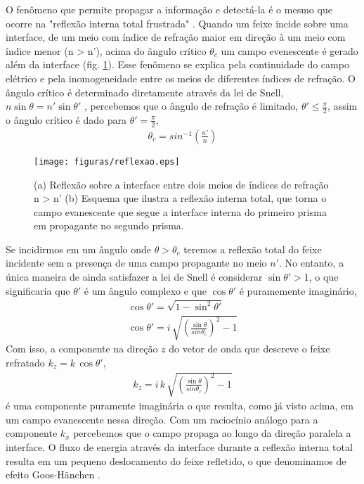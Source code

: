 O fenômeno que permite propagar a informação e detectá-la é o mesmo que ocorre na "reflexão interna total frustrada"  \cite{principle}. Quando um feixe incide sobre uma interface, de um meio com índice de refração maior em direção à um meio com índice menor (n > n'), acima do ângulo crítico $\theta_c$ um campo evenescente é gerado além da interface (fig. \ref{fig:reflexao}). Esse fenômeno se explica pela continuidade do campo elétrico e pela inomogeneidade entre os meios de diferentes índices de refração. O ângulo crítico é determinado diretamente através da lei de Snell, $n\sin{\theta}=n'\sin{\theta '}$  \cite{jackson}, percebemos que o ângulo de refração é limitado, $\theta ' \leq \frac{\pi}{2}$, assim o ângulo crítico é dado para $\theta ' = \frac{\pi}{2}$,
\begin{eqnarray}
\theta_c=sin^{-1}\left({\frac{n'}{n}}\right)
\label{angcritico}
\end{eqnarray}
\begin{figure}[h]
\centering
\texttt{[image: figuras/reflexao.eps]}
\caption{(a) Reflexão sobre a interface entre dois meios de índices de refração n > n' (b) Esquema que ilustra a reflexão interna total, que torna o campo evanescente que segue a interface interna do primeiro prisma em propagante no segundo prisma.  \cite{principle}}
\label{fig:reflexao}
\end{figure}
Se incidirmos em um ângulo onde $\theta > \theta_c$ teremos a reflexão total do feixe incidente sem a presença de uma campo propagante no meio $n'$. No entanto, a única maneira de ainda satisfazer a lei de Snell é considerar $\sin{\theta '} > 1$, o que significaria que $\theta '$ é um ângulo complexo e que $\cos{\theta '}$ é puramemente imaginário,
\begin{eqnarray}
\cos{\theta '}=\sqrt{1-\sin^2{\theta '}} \nonumber \\
\cos{\theta '}=i\,\sqrt{\left(\frac{\sin{\theta}}{sin{\theta_c}}\right)^2-1}
\end{eqnarray}
Com isso, a componente na direção $z$ do vetor de onda que descreve o feixe refratado $k_z=k\,\cos{\theta '},$
\begin{eqnarray}
k_z=i\,k\,\sqrt{\left(\frac{\sin{\theta}}{sin{\theta_c}}\right)^2-1}
\label{kz_reflet}
\end{eqnarray}
é uma componente puramente imaginária o que resulta, como já visto acima, em um campo evanescente nessa direção. Com um raciocínio análogo para a componente $k_x$ percebemos que o campo propaga ao longo da direção paralela a interface. O fluxo de energia através da interface durante a reflexão interna total resulta em um pequeno deslocamento do feixe refletido, o que denominamos de efeito Goos-Hänchen \cite{jackson}.

